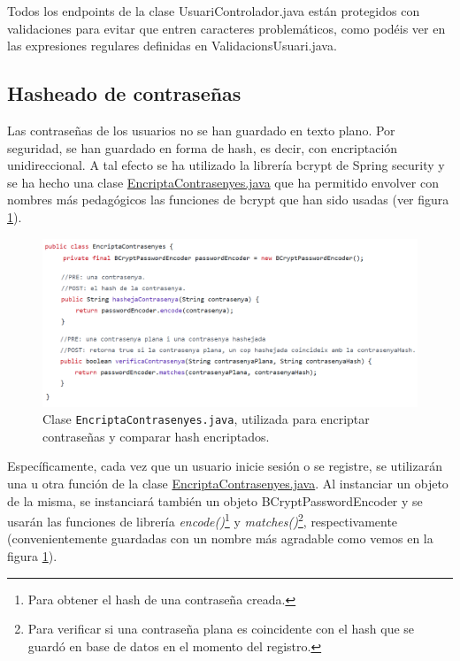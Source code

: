 \documentclass[a4paper,12pt]{report}
\begin{document}
			Todos los endpoints de la clase UsuariControlador.java están protegidos con validaciones para evitar que entren caracteres problemáticos, como podéis ver en las expresiones regulares definidas en ValidacionsUsuari.java.

			\subsection{Hasheado de contraseñas}
			\label{sec:implementacioHashContra}
			
			Las contraseñas de los usuarios no se han guardado en texto plano. Por seguridad, se han guardado en forma de hash, es decir, con encriptación unidireccional. A tal efecto se ha utilizado la librería bcrypt de Spring security\cite{bcryptPasswordEncoder} y se ha hecho una clase \href{https://github.com/blackcub3s/mercApp/blob/main/APP%20WEB/__springboot__produccio__/app/src/main/java/miApp/app/utils/EncriptaContrasenyes.java}{EncriptaContrasenyes.java} que ha permitido envolver con nombres más pedagógicos las funciones de bcrypt que han sido usadas  (ver figura \ref{fig:hashejatContrasenyes}).
			
			\FloatBarrier
			\begin{figure}[H]
				\centering
				\caption{Clase \texttt{EncriptaContrasenyes.java}, utilizada para encriptar contraseñas y comparar hash encriptados.}
				\label{fig:hashejatContrasenyes}
				\includegraphics[width=1\linewidth]{img/hashejatContrasenyes.png}
			\end{figure}
			\FloatBarrier
			
			Específicamente, cada vez que un usuario inicie sesión o se registre, se utilizarán una u otra función de la clase \href{https://github.com/blackcub3s/mercApp/blob/main/APP%20WEB/__springboot__produccio__/app/src/main/java/miApp/app/utils/EncriptaContrasenyes.java}{EncriptaContrasenyes.java}. Al instanciar un objeto de la misma, se instanciará también un objeto BCryptPasswordEncoder y se usarán las funciones de librería \textit{encode()}\footnote{Para obtener el hash de una contraseña creada.} y \textit{matches()}\footnote{Para verificar si una contraseña plana es coincidente con el hash que se guardó en base de datos en el momento del registro.}, respectivamente (convenientemente guardadas con un nombre más agradable como vemos en la figura \ref{fig:hashejatContrasenyes}).
			
\end{document}
